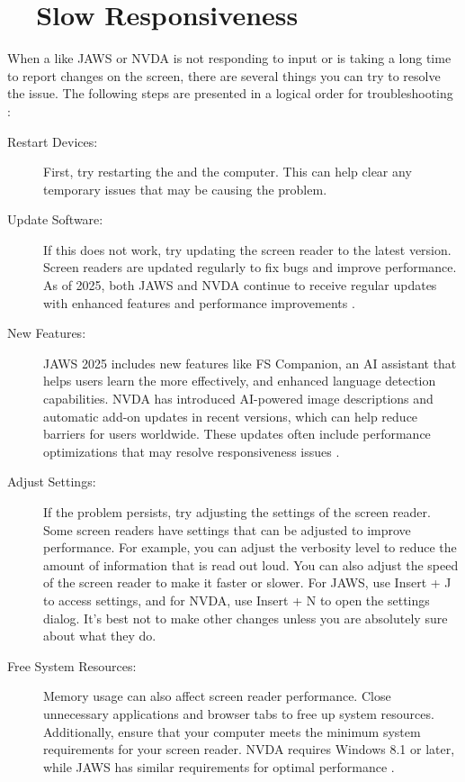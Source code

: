 \section{~~Slow Responsiveness}
\label{app1:response}
When a  like JAWS or NVDA is not responding to input or is taking a long time to report changes on the screen, there are several things you can try to resolve the issue. The following steps are presented in a logical order for troubleshooting \cite{Fowler2011ScreenReaderLatency, Smith2022}:

\begin{description}
	\item[Restart Devices:] First, try restarting the  and the computer. This can help clear any temporary issues that may be causing the problem.
	\item[Update Software:] If this does not work, try updating the screen reader to the latest version. Screen readers are updated regularly to fix bugs and improve performance. As of 2025, both JAWS and NVDA continue to receive regular updates with enhanced features and performance improvements \cite{JAWSWhatsNew, turn0search9}.
	\item[New Features:] JAWS 2025 includes new features like FS Companion, an AI assistant that helps users learn the  more effectively, and enhanced language detection capabilities. NVDA has introduced AI-powered image descriptions and automatic add-on updates in recent versions, which can help reduce barriers for users worldwide. These updates often include performance optimizations that may resolve responsiveness issues \cite{JAWSAILabeler, NarratorImageDescriptions}.
	\item[Adjust Settings:] If the problem persists, try adjusting the settings of the screen reader. Some screen readers have settings that can be adjusted to improve performance. For example, you can adjust the verbosity level to reduce the amount of information that is read out loud. You can also adjust the speed of the screen reader to make it faster or slower. For JAWS, use Insert + J to access settings, and for NVDA, use Insert + N to open the settings dialog. It's best not to make other changes unless you are absolutely sure about what they do.
	\item[Free System Resources:] Memory usage can also affect screen reader performance. Close unnecessary applications and browser tabs to free up system resources. Additionally, ensure that your computer meets the minimum system requirements for your screen reader. NVDA requires Windows 8.1 or later, while JAWS has similar requirements for optimal performance \cite{NVDARequirements, JAWSRequirements}.

\end{description}
